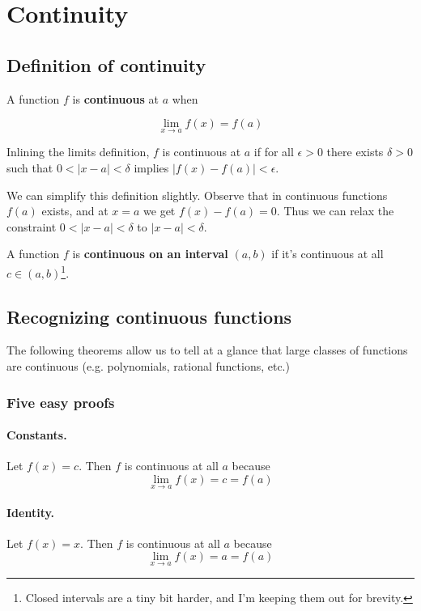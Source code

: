 \section{Continuity}

\subsection{Definition of continuity}

A function $f$ is \textbf{continuous} at $a$ when

\[\lim_{x\to a}f(x)=f(a)\]

Inlining the limits definition, $f$ is continuous at $a$ if for all
$\epsilon>0$ there exists $\delta>0$ such that $0<|x-a|<\delta$ implies
$|f(x)-f(a)|<\epsilon$.

\vs

We can simplify this definition slightly. Observe that in continuous
functions $f(a)$ exists, and at $x=a$ we get $f(x)-f(a)=0$. Thus we
can relax the constraint $0<|x-a|<\delta$ to $|x-a|<\delta$.

\vs

A function $f$ is \textbf{continuous on an interval} $(a, b)$ if it's
continuous at all $c\in(a,b)$\footnote{Closed intervals are a tiny bit
  harder, and I'm keeping them out for brevity.}.

\subsection{Recognizing continuous functions}
The following theorems allow us to tell at a glance that large classes
of functions are continuous (e.g. polynomials, rational functions,
etc.)

\subsubsection*{Five easy proofs}

\paragraph{Constants.} Let $f(x)=c$. Then $f$ is continuous at all $a$
because
\[\lim_{x\to a}f(x)=c=f(a)\]

\paragraph{Identity.} Let $f(x)=x$. Then $f$ is continuous at all $a$
because
\[\lim_{x\to a}f(x)=a=f(a)\]

